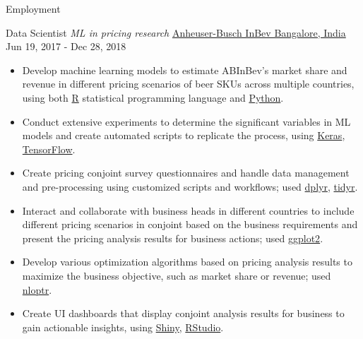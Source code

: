 \documentclass[]{mcdowellcv}
\begin{document}
\begin{cvsection}{Employment}
    \begin{cvsubsection}
      {Data Scientist \linebreak \textit{ML in pricing research}}
      {\href{https://www.abinbev-india.com/}{Anheuser-Busch InBev \linebreak Bangalore, India}}
      {Jun 19, 2017 - Dec 28, 2018}
        \begin{itemize}
          \item
            Develop machine learning models to estimate ABInBev's market
            share and revenue in different pricing scenarios of beer SKUs
            across multiple countries, using both
            \href{https://www.r-project.org/about.html}{R} statistical
            programming language and \href{https://www.python.org/}{Python}.
          \item
            Conduct extensive experiments to determine the significant
            variables in ML models and create automated scripts to replicate
            the process, using \href{https://keras.io/}{Keras},
            \href{https://www.tensorflow.org/}{TensorFlow}.
          \item
            Create pricing conjoint survey questionnaires and handle data
            management and pre-processing using customized scripts and
            workflows; used \href{https://dplyr.tidyverse.org/}{dplyr},
            \href{https://tidyr.tidyverse.org/}{tidyr}.
          \item
            Interact and collaborate with business heads in different
            countries to include different pricing scenarios in conjoint
            based on the business requirements and present the pricing
            analysis results for business actions; used
            \href{https://ggplot2.tidyverse.org/}{ggplot2}.
          \item
            Develop various optimization algorithms based on pricing analysis
            results to maximize the business objective, such as market share
            or revenue; used
            \href{https://cran.r-project.org/web/packages/nloptr/}{nloptr}.
          \item
            Create UI dashboards that display conjoint analysis results for
            business to gain actionable insights, using
            \href{https://shiny.rstudio.com/}{Shiny},
            \href{https://posit.co/}{RStudio}.
        \end{itemize}
    \end{cvsubsection}
  \end{cvsection}
\end{document}
